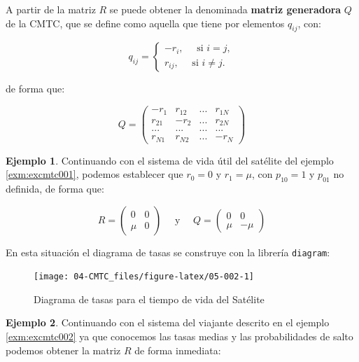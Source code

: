 \documentclass[
]{book}
\theoremstyle{definition}
\theoremstyle{definition}
\newtheorem{example}{Ejemplo}[chapter]
\theoremstyle{definition}
\theoremstyle{definition}
\theoremstyle{remark}
\begin{document}
A partir de la matriz \(R\) se puede obtener la denominada \textbf{matriz generadora} \(Q\) de la CMTC, que se define como aquella que tiene por elementos \(q_{ij}\), con:

\[q_{ij} = \begin{cases}
-r_i, \quad \text{ si } i = j, \\
r_{ij}, \quad \text{ si } i \neq j.
\end{cases}\]

de forma que:

\[Q = 
\begin{pmatrix}
-r_1 & r_{12} & ... & r_{1N}\\
r_{21} & -r_2 & ... & r_{2N}\\
... & ... & ... & ...\\
r_{N1} & r_{N2} & ... & -r_N
\end{pmatrix}\]

\begin{example}
\protect\hypertarget{exm:excmtc003}{}\label{exm:excmtc003}Continuando con el sistema de vida útil del satélite del ejemplo \ref{exm:excmtc001}, podemos establecer que \(r_0 = 0\) y \(r_1 = \mu\), con \(p_{10} = 1\) y \(p_{01}\) no definida, de forma que:
\end{example}

\[R = 
\begin{pmatrix}
0 & 0 \\
\mu & 0
\end{pmatrix} \quad \text{ y } \quad Q = 
\begin{pmatrix}
0 & 0 \\
\mu & -\mu
\end{pmatrix}\]

En esta situación el diagrama de tasas se construye con la librería \texttt{diagram}:

\begin{figure}

{\centering \texttt{[image: 04-CMTC\_files/figure-latex/05-002-1]} 

}

\caption{Diagrama de tasas para el tiempo de vida del Satélite}\label{fig:05-002}
\end{figure}

\begin{example}
\protect\hypertarget{exm:excmtc004}{}\label{exm:excmtc004}Continuando con el sistema del viajante descrito en el ejemplo \ref{exm:excmtc002} ya que conocemos las tasas medias y las probabilidades de salto podemos obtener la matriz \(R\) de forma inmediata:
\end{example}
\end{document}
